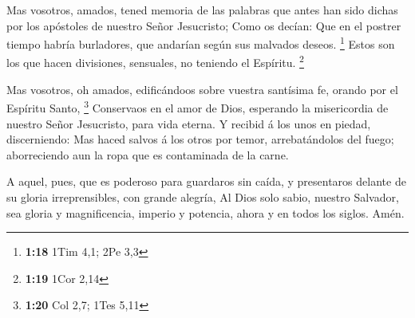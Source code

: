  Mas vosotros, amados, tened memoria de las palabras que
antes han sido dichas por los apóstoles de nuestro Señor Jesucristo;
 Como os decían: Que en el postrer tiempo habría
burladores, que andarían según sus malvados deseos. \footnote{\textbf{1:18}
  1Tim 4,1; 2Pe 3,3}  Estos son los que hacen divisiones,
sensuales, no teniendo el Espíritu. \footnote{\textbf{1:19} 1Cor 2,14}

 Mas vosotros, oh amados, edificándoos sobre vuestra
santísima fe, orando por el Espíritu Santo, \footnote{\textbf{1:20} Col
  2,7; 1Tes 5,11}  Conservaos en el amor de Dios, esperando
la misericordia de nuestro Señor Jesucristo, para vida eterna.
 Y recibid á los unos en piedad, discerniendo:
 Mas haced salvos á los otros por temor, arrebatándolos del
fuego; aborreciendo aun la ropa que es contaminada de la carne.

 A aquel, pues, que es poderoso para guardaros sin caída, y
presentaros delante de su gloria irreprensibles, con grande alegría,
 Al Dios solo sabio, nuestro Salvador, sea gloria y
magnificencia, imperio y potencia, ahora y en todos los siglos. Amén.
